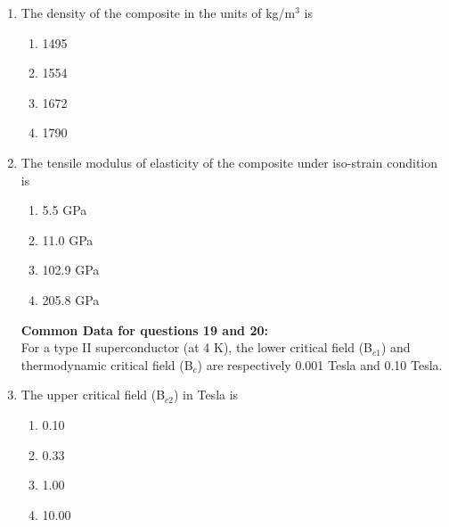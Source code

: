 \documentclass[a4paper,10pt]{article}
\begin{document}
\begin{enumerate}
\textbf{Common Data for Questions 17 and 18:} \\
A unidirectional carbon fiber epoxy matrix composite contains 60 vol \% carbon fibers. The density of carbon fiber is 1790 kg/m$^3$ and that of the epoxy matrix is 1200kg/m$^3$. The tensile moduli of the carbon fiber and the epoxy matrix are 340 GPa and 4.50 GPa respectively.

\item The density of the composite in the units of kg/m$^3$ is
\hfill{}

\begin{multicols}{4}
\begin{enumerate}
\item 1495
\item 1554
\item 1672
\item 1790
\end{enumerate}
\end{multicols}

\item The tensile modulus of elasticity of the composite under iso-strain condition is
\hfill{}

\begin{multicols}{4}
\begin{enumerate}
\item 5.5 GPa
\item 11.0 GPa
\item 102.9 GPa
\item 205.8 GPa
\end{enumerate}
\end{multicols}

\textbf{Common Data for questions 19 and 20:} \\
For a type II superconductor (at 4 K), the lower critical field (B$_{c1}$) and thermodynamic critical field (B$_c$) are respectively 0.001 Tesla and 0.10 Tesla.

\item The upper critical field (B$_{c2}$) in Tesla is
\hfill{}

\begin{multicols}{4}
\begin{enumerate}
\item 0.10
\item 0.33
\item 1.00
\item 10.00
\end{enumerate}
\end{multicols}


\end{enumerate}
\end{document}
